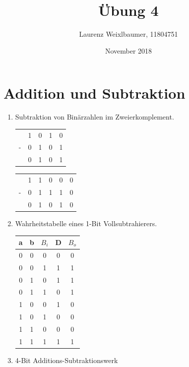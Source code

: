 \documentclass{article}
\title{Übung 4}
\author{Laurenz Weixlbaumer, 11804751}
\date{November 2018}
\begin{document}
\maketitle

\section{Addition und Subtraktion}

\begin{enumerate}[label=(\alph*)]

\item Subtraktion von Binärzahlen im Zweierkomplement.

\begin{tabular}{ c c c c c }
      & 1 & 0 & 1 & 0 \\
    - & 0 & 1 & 0 & 1 \\
    \hline
      & 0 & 1 & 0 & 1
\end{tabular}

\begin{tabular}{ c c c c c c }
      & 1 & 1 & 0 & 0 & 0 \\
    - & 0 & 1 & 1 & 1 & 0 \\
    \hline
      & 0 & 1 & 0 & 1 & 0
\end{tabular}

\item Wahrheitstabelle eines 1-Bit Vollsubtrahierers.

\begin{tabular}{ c c c | c c }
    a & b & $B_i$ & D & $B_o$ \\
    \hline
    0 & 0 & 0 & 0 & 0  \\
    0 & 0 & 1 & 1 & 1  \\
    0 & 1 & 0 & 1 & 1  \\
    0 & 1 & 1 & 0 & 1  \\
    1 & 0 & 0 & 1 & 0  \\
    1 & 0 & 1 & 0 & 0  \\
    1 & 1 & 0 & 0 & 0  \\
    1 & 1 & 1 & 1 & 1
\end{tabular}

\clearpage

\item 4-Bit Additions-Subtraktionswerk


\end{enumerate}
\end{document}
